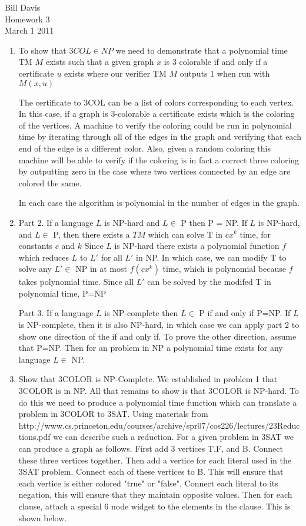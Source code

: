 \documentclass[11pt,fleqn]{article}
\begin{document}
\newcommand{\mbf}[1]{\mbox{{\bfseries #1}}}
\newcommand{\N}{\mbf{N}}
\renewcommand{\O}{\mbf{O}}

\noindent Bill Davis \\
Homework 3 \\
March 1 2011

\begin{enumerate}

\item
To show that $3COL \in NP$ we need to demonstrate that a polynomial time TM $M$ exists such that a given graph $x$ is 3 colorable if and only if a certificate $u$ exists where our verifier TM $M$ outputs 1 when run with $M(x,u)$

The certificate to 3COL can be a list of colors corresponding to each vertex. In this case, if a graph is 3-colorable a certificate exists which is the coloring of the vertices. A machine to verify the coloring could be run in polynomial time by iterating through all of the edges in the graph and verifying that each end of the edge is a different color. Also, given a random coloring this machine will be able to verify if the coloring is in fact a correct three coloring by outputting zero in the case where two vertices connected by an edge are colored the same.

In each case the algorithm is polynomial in the number of edges in the graph. 

\item
Part 2. If a language $L$ is NP-hard and $L \in$ P then P = NP. If $L$ is NP-hard, and $L \in $ P, then there exists a $TM$ which can solve T in $cx^k$ time, for constants $c$ and $k$ Since $L$ is NP-hard there exists a polynomial function $f$ which reduces $L$ to $L'$ for all $L'$ in NP. In which case, we can modify T to solve any $L' \in $ NP in at most $f(cx^k)$ time, which is polynomial because $f$ takes polynomial time. Since all $L'$ can be solved by the modifed T in polynomial time, P=NP

Part 3. If a language $L$ is NP-complete then $L \in$ P if and only if P=NP. If $L$ is NP-complete, then it is also NP-hard, in which case we can apply part 2 to show one direction of the if and only if. To prove the other direction, assume that P=NP. Then for an problem in NP a polynomial time exists for any language $L \in$  NP.

\item Show that 3COLOR is NP-Complete. 
We established in problem 1 that 3COLOR is in NP. All that remains to show is that 3COLOR is NP-hard. To do this we need to produce a polynomial time function which can translate a problem in 3COLOR to 3SAT. Using materials from http://www.cs.princeton.edu/courses/archive/spr07/cos226/lectures/23Reductions.pdf we can describe such a reduction. For a given problem in 3SAT we can produce a graph as follows. First add 3 vertices T,F, and B. Connect these three vertices together. Then add a vertice for each literal used in the 3SAT problem. Connect each of these vertices to B. This will ensure that each vertice is either colored "true" or "false". Connect each literal to its negation, this will ensure that they maintain opposite values. Then for each clause, attach a special 6 node widget to the elements in the clause. This is shown below. 


\end{enumerate}
\end{document}
